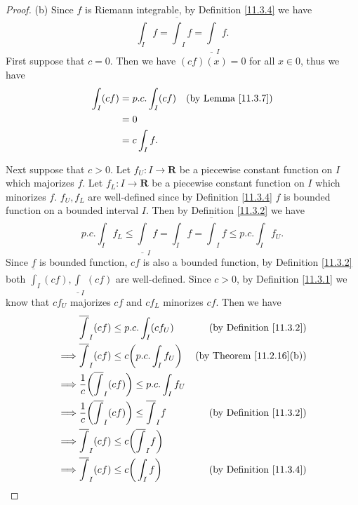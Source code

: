 \begin{proof}{(b)}
    Since \(f\) is Riemann integrable, by Definition \ref{11.3.4} we have
    \[
        \int_I f = \overline{\int}_I f = \underline{\int}_I f.
    \]
    First suppose that \(c = 0\).
    Then we have \((cf)(x) = 0\) for all \(x \in 0\), thus we have
    \begin{align*}
        \int_I (cf) & = p.c. \int_I (cf) & \text{(by Lemma \ref{11.3.7})} \\
                    & = 0                                                 \\
                    & = c \int_I f.
    \end{align*}

    Next suppose that \(c > 0\).
    Let \(f_U : I \to \mathbf{R}\) be a piecewise constant function on \(I\) which majorizes \(f\).
    Let \(f_L : I \to \mathbf{R}\) be a piecewise constant function on \(I\) which minorizes \(f\).
    \(f_U, f_L\) are well-defined since by Definition \ref{11.3.4} \(f\) is bounded function on a bounded interval \(I\).
    Then by Definition \ref{11.3.2} we have
    \[
        p.c. \int_I f_L \leq \underline{\int}_I f = \int_I f = \overline{\int}_I f \leq p.c. \int_I f_U.
    \]
    Since \(f\) is bounded function, \(cf\) is also a bounded function, by Definition \ref{11.3.2} both \(\overline{\int}_I (cf), \underline{\int}_I (cf)\) are well-defined.
    Since \(c > 0\), by Definition \ref{11.3.1} we know that \(c f_U\) majorizes \(c f\) and \(c f_L\) minorizes \(c f\).
    Then we have
    \begin{align*}
                 & \overline{\int}_I (cf) \leq p.c. \int_I (c f_U)                         & \text{(by Definition \ref{11.3.2})}  \\
        \implies & \overline{\int}_I (cf) \leq c \bigg(p.c. \int_I f_U\bigg)               & \text{(by Theorem \ref{11.2.16}(b))} \\
        \implies & \frac{1}{c} \bigg(\overline{\int}_I (cf)\bigg) \leq p.c. \int_I f_U                                            \\
        \implies & \frac{1}{c} \bigg(\overline{\int}_I (cf)\bigg) \leq \overline{\int}_I f & \text{(by Definition \ref{11.3.2})}  \\
        \implies & \overline{\int}_I (cf) \leq c\bigg(\overline{\int}_I f\bigg)                                                   \\
        \implies & \overline{\int}_I (cf) \leq c\bigg(\int_I f\bigg)                       & \text{(by Definition \ref{11.3.4})}

\end{align*}
\end{proof}
